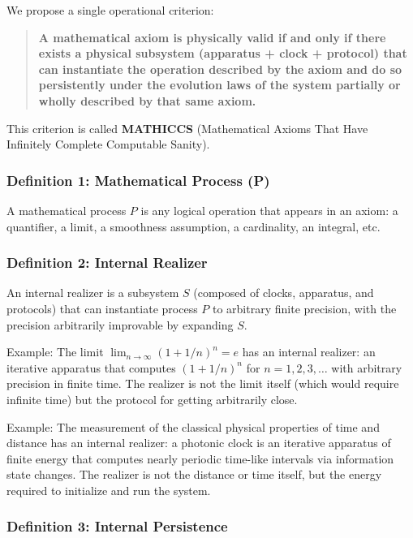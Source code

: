 \documentclass[11pt,a4paper]{article}
\begin{document}
  We propose a single operational criterion:

  \begin{quote}
  \textbf{A mathematical axiom is physically valid if and only if there exists a physical subsystem (apparatus + clock + protocol) that can instantiate the operation described by the axiom and do so persistently under the evolution laws of the system partially or wholly described by that same axiom.}
  \end{quote}

  This criterion is called \textbf{MATHICCS} (Mathematical Axioms That Have Infinitely Complete Computable Sanity).

  \subsubsection{Definition 1: Mathematical Process (P)}

  A mathematical process $P$ is any logical operation that appears in an axiom: a quantifier, a limit, a smoothness assumption, a cardinality, an integral, etc. 

  \subsubsection{Definition 2: Internal Realizer}

  An internal realizer is a subsystem $S$ (composed of clocks, apparatus, and protocols) that can instantiate process $P$ to arbitrary finite precision, with the precision arbitrarily improvable by expanding $S$.

  Example: The limit $\lim_{n \to \infty} (1 + 1/n)^n = e$ has an internal realizer: an iterative apparatus that computes $(1 + 1/n)^n$ for $n = 1, 2, 3, \ldots$ with arbitrary precision in finite time. The realizer is not the limit itself (which would require infinite time) but the protocol for getting arbitrarily close.

  Example: The measurement of the classical physical properties of time and distance has an internal realizer: a photonic clock is an iterative apparatus of finite energy that computes nearly periodic time-like intervals via information state changes. The realizer is not the distance or time itself, but the energy required to initialize and run the system. 

  \subsubsection{Definition 3: Internal Persistence}
\end{document}
